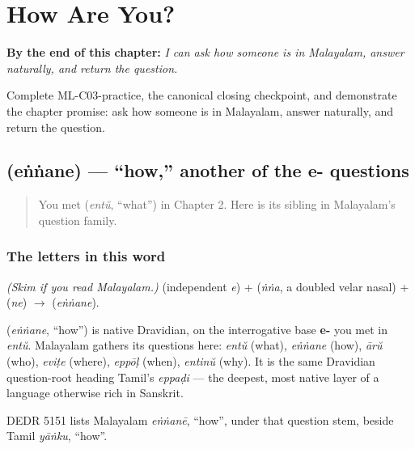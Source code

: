 
\chapter{How Are You?}
\label{ch:responding}

\begin{chapteropening}
\textbf{By the end of this chapter:} \emph{I can ask how someone is in Malayalam, answer naturally, and return the question.}

Complete ML-C03-practice, the canonical closing checkpoint, and demonstrate the chapter promise: ask how someone is in Malayalam, answer naturally, and return the question.
\end{chapteropening}

\section[\texorpdfstring{\ml{എങ്ങനെ} (eṅṅane)}{എങ്ങനെ (eṅṅane)}]{ (eṅṅane) — \textquotedblleft{}how,\textquotedblright{} another of the e- questions}

\label{lesson:ML-C03-engane}



\begin{quote}
You met \textbf{} (\emph{entŭ}, \textquotedblleft{}what\textquotedblright{}) in Chapter 2. Here is its sibling in Malayalam's question family.
\end{quote}

\subsection*{The letters in this word}
\emph{(Skim if you read Malayalam.)} \textbf{} (independent \emph{e}) + \textbf{} (\emph{ṅṅa}, a doubled velar nasal) + \textbf{} (\emph{ne}) $\to$ \textbf{} (\emph{eṅṅane}).

\begin{cousinweb}
\textbf{} (\emph{eṅṅane}, \textquotedblleft{}how\textquotedblright{}) is native Dravidian, on the interrogative base \textbf{e-} you met in \emph{entŭ}. Malayalam gathers its questions here: \emph{entŭ} (what), \emph{eṅṅane} (how), \emph{ārŭ} (who), \emph{eviṭe} (where), \emph{eppōḷ} (when), \emph{entinŭ} (why). It is the same Dravidian question-root heading Tamil's \emph{eppaḍi} — the deepest, most native layer of a language otherwise rich in Sanskrit.

DEDR 5151 lists Malayalam \emph{eṅṅanē}, \textquotedblleft{}how\textquotedblright{}, under that question stem, beside Tamil \emph{yāṅku}, \textquotedblleft{}how\textquotedblright{}.
\end{cousinweb}

